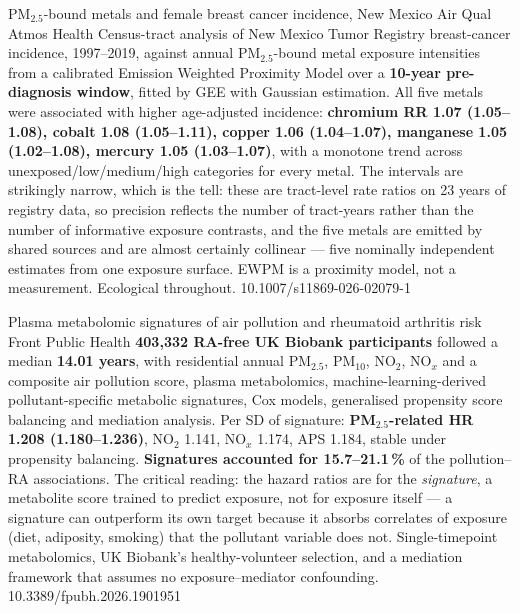 \documentclass[10pt]{article}
\begin{document}
{PM$_{2.5}$-bound metals and female breast cancer incidence, New Mexico}
{Air Qual Atmos Health}
{Census-tract analysis of New Mexico Tumor Registry breast-cancer incidence, 1997--2019,
against annual PM$_{2.5}$-bound metal exposure intensities from a calibrated Emission
Weighted Proximity Model over a \textbf{10-year pre-diagnosis window}, fitted by GEE with
Gaussian estimation. All five metals were associated with higher age-adjusted incidence:
\textbf{chromium RR 1.07 (1.05--1.08), cobalt 1.08 (1.05--1.11), copper 1.06
(1.04--1.07), manganese 1.05 (1.02--1.08), mercury 1.05 (1.03--1.07)}, with a monotone
trend across unexposed/low/medium/high categories for every metal. The intervals are
strikingly narrow, which is the tell: these are tract-level rate ratios on 23 years of
registry data, so precision reflects the number of tract-years rather than the number of
informative exposure contrasts, and the five metals are emitted by shared sources and are
almost certainly collinear --- five nominally independent estimates from one exposure
surface. EWPM is a proximity model, not a measurement. Ecological throughout.}
{10.1007/s11869-026-02079-1}

{Plasma metabolomic signatures of air pollution and rheumatoid arthritis risk}
{Front Public Health}
{\textbf{403{,}332 RA-free UK Biobank participants} followed a median \textbf{14.01
years}, with residential annual PM$_{2.5}$, PM$_{10}$, NO$_2$, NO$_x$ and a composite air
pollution score, plasma metabolomics, machine-learning-derived pollutant-specific
metabolic signatures, Cox models, generalised propensity score balancing and mediation
analysis. Per SD of signature: \textbf{PM$_{2.5}$-related HR 1.208 (1.180--1.236)},
NO$_2$ 1.141, NO$_x$ 1.174, APS 1.184, stable under propensity balancing.
\textbf{Signatures accounted for 15.7--21.1\,\%} of the pollution--RA associations.
The critical reading: the hazard ratios are for the \emph{signature}, a metabolite score
trained to predict exposure, not for exposure itself --- a signature can outperform its
own target because it absorbs correlates of exposure (diet, adiposity, smoking) that the
pollutant variable does not. Single-timepoint metabolomics, UK Biobank's healthy-volunteer
selection, and a mediation framework that assumes no exposure--mediator confounding.}
{10.3389/fpubh.2026.1901951}
\end{document}

